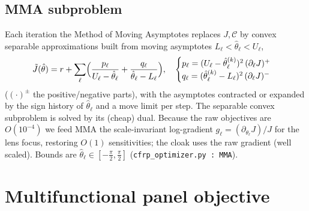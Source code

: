 \subsection{MMA subproblem}
Each iteration the Method of Moving Asymptotes \cite{svanberg1987} replaces $J,\mathcal C$ by convex
separable approximations built from moving asymptotes $L_\ell<\hat\theta_\ell<U_\ell$,
\begin{equation}
  \tilde J(\hat\theta)=r+\sum_\ell\Bigl(\frac{p_\ell}{U_\ell-\hat\theta_\ell}
  +\frac{q_\ell}{\hat\theta_\ell-L_\ell}\Bigr),\quad
  \begin{cases} p_\ell=(U_\ell-\hat\theta_\ell^{(k)})^2\,(\partial_\ell J)^+\\
  q_\ell=(\hat\theta_\ell^{(k)}-L_\ell)^2\,(\partial_\ell J)^-\end{cases}
\end{equation}
($(\cdot)^\pm$ the positive/negative parts), with the asymptotes contracted or
expanded by the sign history of $\hat\theta_\ell$ and a move limit per step. The
separable convex subproblem is solved by its (cheap) dual. Because the raw
objectives are $O(10^{-4})$ we feed MMA the scale-invariant log-gradient
$g_\ell=(\partial_{\theta_\ell}J)/J$ for the lens focus, restoring $O(1)$
sensitivities; the cloak uses the raw gradient (well scaled). Bounds are
$\hat\theta_\ell\in[-\tfrac\pi2,\tfrac\pi2]$ (\texttt{cfrp\_optimizer.py : MMA}).

\section{Multifunctional panel objective}\label{app:panelobj}

